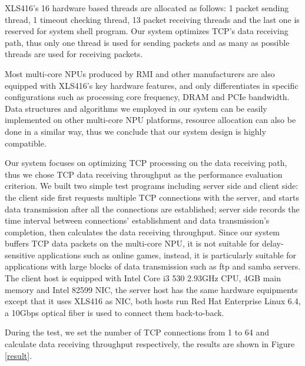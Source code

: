 \documentclass[conference]{IEEEtran}
\begin{document}
XLS416's 16 hardware based threads are allocated as follows: 1 packet sending thread, 1 timeout checking thread, 13 packet receiving threads and the last one is reserved for system shell program. Our system optimizes TCP's data receiving path, thus only one thread is used for sending packets and as many as possible threads are used for receiving packets.

Most multi-core NPUs produced by RMI and other manufacturers are also equipped with XLS416's key hardware features, and only differentiates in specific configurations such as processing core frequency, DRAM and PCIe bandwidth. Data structures and algorithms we employed in our system can be easily implemented on other multi-core NPU platforms, resource allocation can also be done in a similar way, thus we conclude that our system design is highly compatible.

Our system focuses on optimizing TCP processing on the data receiving path, thus we chose TCP data receiving throughput as the performance evaluation criterion. We built two simple test programs including server side and client side: the client side first requests multiple TCP connections with the server, and starts data transmission after all the connections are established; server side records the time interval between connections' establishment and data transmission's completion, then calculates the data receiving throughput. Since our system buffers TCP data packets on the multi-core NPU, it is not suitable for delay-sensitive applications such as online games, instead, it is particularly suitable for applications with large blocks of data transmission such as ftp and samba servers. The client host is equipped with Intel Core i3 530 2.93GHz CPU, 4GB main memory and Intel 82599 NIC, the server host has the same hardware equipments except that it uses XLS416 as NIC, both hosts run Red Hat Enterprise Linux 6.4, a 10Gbps optical fiber is used to connect them back-to-back.

During the test, we set the number of TCP connections from 1 to 64 and calculate data receiving throughput respectively, the results are shown in Figure \ref{result}.
\end{document}
